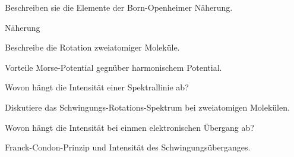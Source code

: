 \documentclass[a5paper,12pt,ngerman,print,grid=front]{kartei}
\begin{document}
	\begin{karte}{
		Beschreiben sie die Elemente der Born-Openheimer Näherung.
		}
		
		Näherung 
		
	\end{karte}


	\begin{karte}{
		Beschreibe die Rotation zweiatomiger Moleküle.
		}
		
		
		
	\end{karte}


	\begin{karte}{
		Vorteile Morse-Potential gegnüber harmonischem Potential.
		}
		
		
		
	\end{karte}


	\begin{karte}{
		Wovon hängt die Intensität einer Spektrallinie ab?
		}
		
		
		
	\end{karte}


	\begin{karte}{
		Diskutiere das Schwingungs-Rotations-Spektrum bei zweiatomigen Molekülen.
		}
		
		
		
	\end{karte}


	\begin{karte}{
		Wovon hängt die Intensität bei einmen elektronischen Übergang ab?
		}
		
		
		
	\end{karte}


	\begin{karte}{
		Franck-Condon-Prinzip und Intensität des Schwingungsüberganges.
		}
		
		
		
	\end{karte}
\end{document}
